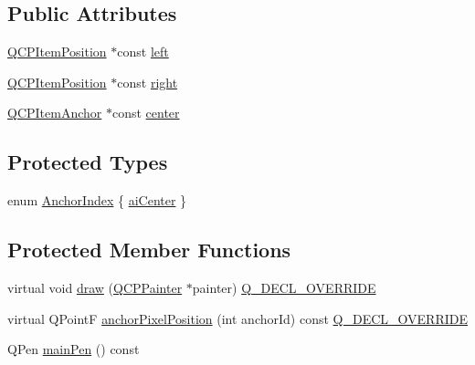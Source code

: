 \subsection*{Public Attributes}
\begin{DoxyCompactItemize}
\item 
\hyperlink{class_q_c_p_item_position}{Q\+C\+P\+Item\+Position} $\ast$const \hyperlink{class_q_c_p_item_bracket_af6cc6d27d96171778c6927d6edce48b0}{left}
\item 
\hyperlink{class_q_c_p_item_position}{Q\+C\+P\+Item\+Position} $\ast$const \hyperlink{class_q_c_p_item_bracket_afa6c1360b05a50c4e0df37b3cebab6be}{right}
\item 
\hyperlink{class_q_c_p_item_anchor}{Q\+C\+P\+Item\+Anchor} $\ast$const \hyperlink{class_q_c_p_item_bracket_a2dbcabdf5f467f28be12a7b25962ffca}{center}
\end{DoxyCompactItemize}
\subsection*{Protected Types}
\begin{DoxyCompactItemize}
\item 
enum \hyperlink{class_q_c_p_item_bracket_a7f3a6a56d67f71219ed220553f3dd861}{Anchor\+Index} \{ \hyperlink{class_q_c_p_item_bracket_a7f3a6a56d67f71219ed220553f3dd861a17b57ef34cc05eadfe9becd1ad5b5242}{ai\+Center}
 \}
\end{DoxyCompactItemize}
\subsection*{Protected Member Functions}
\begin{DoxyCompactItemize}
\item 
virtual void \hyperlink{class_q_c_p_item_bracket_a942a3978aea44a2fc7b4383f2bf6d417}{draw} (\hyperlink{class_q_c_p_painter}{Q\+C\+P\+Painter} $\ast$painter) \hyperlink{qcustomplot_8h_a42cc5eaeb25b85f8b52d2a4b94c56f55}{Q\+\_\+\+D\+E\+C\+L\+\_\+\+O\+V\+E\+R\+R\+I\+DE}
\item 
virtual Q\+PointF \hyperlink{class_q_c_p_item_bracket_a008d87325d26b6616d368cec06027cce}{anchor\+Pixel\+Position} (int anchor\+Id) const \hyperlink{qcustomplot_8h_a42cc5eaeb25b85f8b52d2a4b94c56f55}{Q\+\_\+\+D\+E\+C\+L\+\_\+\+O\+V\+E\+R\+R\+I\+DE}
\item 
Q\+Pen \hyperlink{class_q_c_p_item_bracket_af1c445df1a574bddc8a40efcd76dd2e1}{main\+Pen} () const
\end{DoxyCompactItemize}
